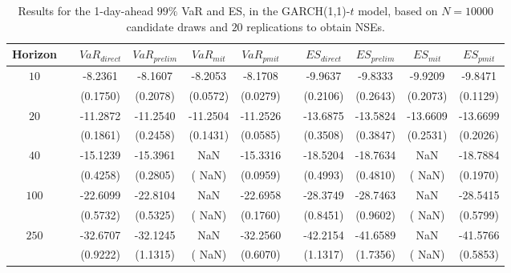 \begin{table}[h] 
\centering 
\caption{Results for the 1-day-ahead $99\%$ VaR and ES, in the GARCH(1,1)-$t$ model, based on $N=10000$ candidate draws and $20$ replications to obtain NSEs.} 
\label{tab:res_algos_t_garch2_noS} 
\begin{tabular}{ccccccccccc}  
 Horizon & & $VaR_{direct}$ & $VaR_{prelim}$ & $VaR_{mit}$  & $VaR_{pmit}$ &  & $ES_{direct}$ & $ES_{prelim}$ & $ES_{mit}$ & $ES_{pmit}$ \\ \hline 
$10$ & & -8.2361 & -8.1607 & -8.2053 & -8.1708 & & -9.9637 & -9.8333 & -9.9209 & -9.8471  \\ 
 & & (0.1750) & (0.2078) & (0.0572) & (0.0279) & & (0.2106) & (0.2643) & (0.2073) & (0.1129)   \\ [1ex] 
$20$ & & -11.2872 & -11.2540 & -11.2504 & -11.2526 & & -13.6875 & -13.5824 & -13.6609 & -13.6699  \\ 
 & & (0.1861) & (0.2458) & (0.1431) & (0.0585) & & (0.3508) & (0.3847) & (0.2531) & (0.2026)   \\ [1ex] 
$40$ & & -15.1239 & -15.3961 &    NaN & -15.3316 & & -18.5204 & -18.7634 &    NaN & -18.7884  \\ 
 & & (0.4258) & (0.2805) & (   NaN) & (0.0959) & & (0.4993) & (0.4810) & (   NaN) & (0.1970)   \\ [1ex] 
$100$ & & -22.6099 & -22.8104 &    NaN & -22.6958 & & -28.3749 & -28.7463 &    NaN & -28.5415  \\ 
 & & (0.5732) & (0.5325) & (   NaN) & (0.1760) & & (0.8451) & (0.9602) & (   NaN) & (0.5799)   \\ [1ex] 
$250$ & & -32.6707 & -32.1245 &    NaN & -32.2560 & & -42.2154 & -41.6589 &    NaN & -41.5766  \\ 
 & & (0.9222) & (1.1315) & (   NaN) & (0.6070) & & (1.1317) & (1.7356) & (   NaN) & (0.5853)   \\ [1ex] 
\hline 
\end{tabular} 
\end{table} 
